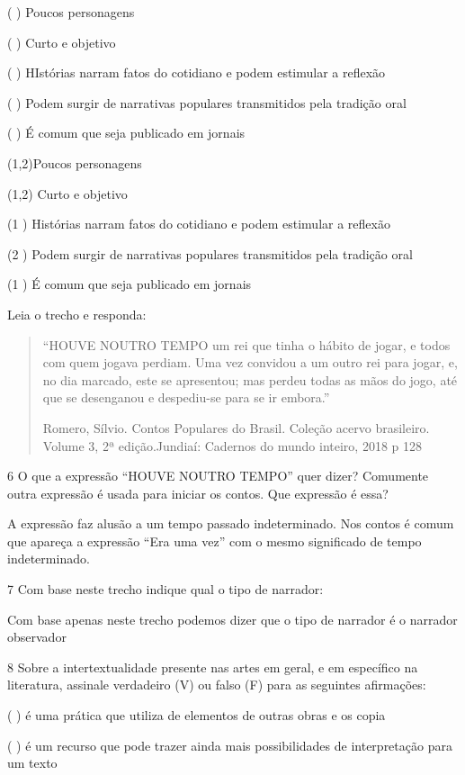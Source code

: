 {( ) Poucos personagens

( ) Curto e objetivo

( ) HIstórias narram fatos do cotidiano e podem estimular a reflexão

( ) Podem surgir de narrativas populares transmitidos pela tradição oral

( ) É comum que seja publicado em jornais

(1,2)Poucos personagens

(1,2) Curto e objetivo

(1 ) Histórias narram fatos do cotidiano e podem estimular a reflexão

(2 ) Podem surgir de narrativas populares transmitidos pela tradição
oral

(1 ) É comum que seja publicado em jornais


Leia o trecho e responda:

\begin{quote}
``HOUVE NOUTRO TEMPO um rei que tinha o hábito de jogar, e todos com
quem jogava perdiam. Uma vez convidou a um outro rei para jogar, e, no
dia marcado, este se apresentou; mas perdeu todas as mãos do jogo, até
que se desenganou e despediu-se para se ir embora.''

Romero, Sílvio. Contos Populares do Brasil. Coleção acervo brasileiro.
Volume 3, 2ª edição.Jundiaí: Cadernos do mundo inteiro, 2018 p 128
\end{quote}

\num{6} O que a expressão ``HOUVE NOUTRO TEMPO'' quer dizer? Comumente outra
  expressão é usada para iniciar os contos. Que expressão é essa?

A expressão faz alusão a um tempo passado indeterminado. Nos contos é
comum que apareça a expressão ``Era uma vez'' com o mesmo significado de
tempo indeterminado.

\num{7} Com base neste trecho indique qual o tipo de narrador:

Com base apenas neste trecho podemos dizer que o tipo de narrador é o
narrador observador

\num{8} Sobre a intertextualidade presente nas artes em geral, e em específico
  na literatura, assinale verdadeiro (V) ou falso (F) para as seguintes
  afirmações:

( ) é uma prática que utiliza de elementos de outras obras e os copia


( ) é um recurso que pode trazer ainda mais possibilidades de
interpretação para um texto


}
